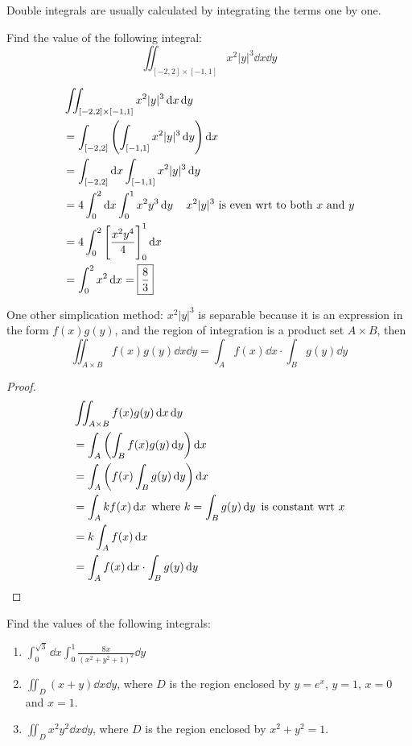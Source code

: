 Double integrals are usually calculated by integrating the terms one by one.

\begin{exercise}
Find the value of the following integral:
\[ \iint_{[-2,2]\times[-1,1]}x^2|y|^3\dd{x}\dd{y} \]
\end{exercise}

\begin{solution}
\begin{align*}
&\iint_{[-2,2]\times[-1,1]}x^2|y|^3\dd{x}\dd{y} \\
&= \int_{[-2,2]}\left(\int_{[-1,1]}x^2|y|^3\dd{y}\right)\dd{x} \\
&= \int_{[-2,2]}\dd{x}\int_{[-1,1]}x^2|y|^3\dd{y} \\
&= 4\int_0^2\dd{x}\int_0^1x^2y^3\dd{y} \quad x^2|y|^3 \text{ is even wrt to both } x \text{ and } y \\
&= 4\int_0^2\left[\frac{x^2y^4}{4}\right]_0^1\dd{x} \\
&= \int_0^2x^2\dd{x}=\boxed{\frac{8}{3}}
\end{align*}
\end{solution}

One other simplication method: $x^2|y|^3$ is separable because it is an expression in the form $f(x)g(y)$, and the region of integration is a product set $A\times B$, then
\[ \iint_{A\times B}f(x)g(y)\dd{x}\dd{y}=\int_Af(x)\dd{x}\cdot\int_Bg(y)\dd{y} \]
\begin{proof}
\begin{align*}
&\iint_{A\times B}f(x)g(y)\dd{x}\dd{y} \\
&= \int_A\left(\int_Bf(x)g(y)\dd{y}\right)\dd{x} \\
&= \int_A\left(f(x)\int_Bg(y)\dd{y}\right)\dd{x} \\
&= \int_Akf(x)\dd{x} \text{ where } k=\int_Bg(y)\dd{y} \text{ is constant wrt } x \\
&= k\int_Af(x)\dd{x} \\
&= \int_Af(x)\dd{x}\cdot\int_Bg(y)\dd{y}
\end{align*}
\end{proof}

\begin{exercise}
Find the values of the following integrals:
\begin{enumerate}[label=(\alph*)]
\item $\displaystyle\int_0^{\sqrt{3}}\dd{x}\int_0^1\frac{8x}{(x^2+y^2+1)^2}\dd{y}$
\item $\displaystyle\iint_D(x+y)\dd{x}\dd{y}$, where $D$ is the region enclosed by $y=e^x$, $y=1$, $x=0$ and $x=1$.
\item $\displaystyle\iint_Dx^2y^2\dd{x}\dd{y}$, where $D$ is the region enclosed by $x^2+y^2=1$.
\end{enumerate}
\end{exercise}

